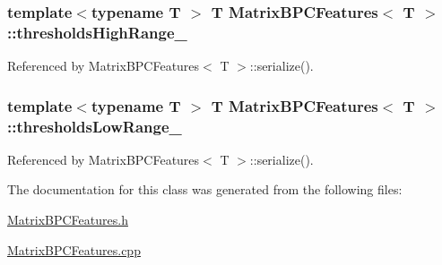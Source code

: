 \subsubsection[{\texorpdfstring{thresholds\+High\+Range\+\_\+}{thresholdsHighRange_}}]{\setlength{\rightskip}{0pt plus 5cm}template$<$typename T $>$ T {\bf Matrix\+B\+P\+C\+Features}$<$ T $>$\+::thresholds\+High\+Range\+\_\+\hspace{0.3cm}{\ttfamily [private]}}\hypertarget{classMatrixBPCFeatures_ae8a6cffe3353dfd370fb0b4e5d2385ca}{}\label{classMatrixBPCFeatures_ae8a6cffe3353dfd370fb0b4e5d2385ca}


Referenced by Matrix\+B\+P\+C\+Features$<$ T $>$\+::serialize().

\subsubsection[{\texorpdfstring{thresholds\+Low\+Range\+\_\+}{thresholdsLowRange_}}]{\setlength{\rightskip}{0pt plus 5cm}template$<$typename T $>$ T {\bf Matrix\+B\+P\+C\+Features}$<$ T $>$\+::thresholds\+Low\+Range\+\_\+\hspace{0.3cm}{\ttfamily [private]}}\hypertarget{classMatrixBPCFeatures_a3b26efde265078abd546a45ea443bf6d}{}\label{classMatrixBPCFeatures_a3b26efde265078abd546a45ea443bf6d}


Referenced by Matrix\+B\+P\+C\+Features$<$ T $>$\+::serialize().



The documentation for this class was generated from the following files\+:\begin{DoxyCompactItemize}
\item 
\hyperlink{MatrixBPCFeatures_8h}{Matrix\+B\+P\+C\+Features.\+h}\item 
\hyperlink{MatrixBPCFeatures_8cpp}{Matrix\+B\+P\+C\+Features.\+cpp}\end{DoxyCompactItemize}
